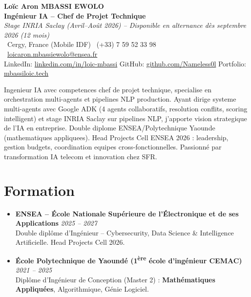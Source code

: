 \documentclass[a4paper,11pt]{article}
\begin{document}
\begin{center}
    {\Large \textbf{Lo\"ic Aron MBASSI EWOLO}} \\ \vspace{4pt}
    \textbf{\large Ing\'enieur IA -- Chef de Projet Technique} \\
    \textit{\small Stage INRIA Saclay (Avril--Ao\^ut 2026) -- Disponible en alternance d\`es septembre 2026 (12 mois)} \\ \vspace{4pt}
    \small
    \Pointinghand\ Cergy, France (Mobile IDF) \quad
    \Mobilefone\ (+33) 7 59 52 33 98 \quad
    {\color{primary}\Letter\ \href{mailto:loicaron.mbassiewolo@ensea.fr}{loicaron.mbassiewolo@ensea.fr}} \\ \vspace{2pt}
    {\color{primary}LinkedIn: \href{https://www.linkedin.com/in/loic-mbassi/}{linkedin.com/in/loic-mbassi}} \quad
    {\color{primary}GitHub: \href{https://github.com/Nameless0l}{github.com/Nameless0l}} \quad
    {\color{primary}Portfolio: \href{https://mbassiloic.tech}{mbassiloic.tech}}
\end{center}
\vspace{-6pt}
\noindent\small{Ingenieur IA avec competences chef de projet technique, specialise en orchestration multi-agents et pipelines NLP production. Ayant dirige systeme multi-agents avec Google ADK (4 agents collaboratifs, resolution conflits, scoring intelligent) et stage INRIA Saclay sur pipelines NLP, j'apporte vision strategique de l'IA en entreprise. Double diplome ENSEA/Polytechnique Yaounde (mathematiques appliquees). Head Projects Cell ENSEA 2026 : leadership, gestion budgets, coordination equipes cross-fonctionnelles. Passionné par transformation IA telecom et innovation chez SFR.}

\section{Formation}
\begin{itemize}[leftmargin=*, label=\tiny$\bullet$, nosep]
    \item \textbf{ENSEA -- \'Ecole Nationale Sup\'erieure de l'\'Electronique et de ses Applications} \hfill \textit{2025 -- 2027} \\
    \small{Double dipl\^ome d'Ing\'enieur -- Cybersecurity, Data Science \& Intelligence Artificielle. Head Projects Cell 2026.}
    \item \textbf{\'Ecole Polytechnique de Yaound\'e (1\textsuperscript{\`ere} \'ecole d'ing\'enieur CEMAC)} \hfill \textit{2021 -- 2025} \\
    \small{Dipl\^ome d'Ing\'enieur de Conception (Master 2) : \textbf{Math\'ematiques Appliqu\'ees}, Algorithmique, G\'enie Logiciel.}
\end{itemize}
\end{document}
